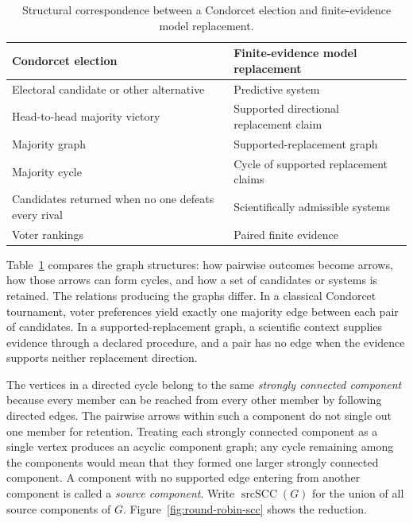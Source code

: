\documentclass[11pt]{article}
\theoremstyle{remark}
\begin{document}
\begin{table}[H]
\centering
\caption{Structural correspondence between a Condorcet election and
finite-evidence model replacement.}
\label{tab:round-robin-analogy}
\small
\begin{tabularx}{\textwidth}{@{}>{\raggedright\arraybackslash}p{}>{\raggedright\arraybackslash}X@{}}
\toprule
Condorcet election & Finite-evidence model replacement \\
\midrule
Electoral candidate or other alternative & Predictive system \\
Head-to-head majority victory & Supported directional replacement claim \\
Majority graph & Supported-replacement graph \\
Majority cycle & Cycle of supported replacement claims \\
Candidates returned when no one defeats every rival & Scientifically admissible systems \\
Voter rankings & Paired finite evidence \\
\bottomrule
\end{tabularx}
\end{table}

Table~\ref{tab:round-robin-analogy} compares the graph structures: how
pairwise outcomes become arrows, how those arrows can form cycles, and how a
set of candidates or systems is retained. The relations producing the graphs
differ. In a classical Condorcet tournament, voter preferences yield exactly
one majority edge between each pair of candidates. In a
supported-replacement graph, a scientific context supplies evidence through a
declared procedure, and a pair has no edge when the evidence supports neither
replacement direction.

The vertices in a directed cycle belong to the same \emph{strongly connected
component} because every member can be reached from every other member by
following directed edges. The pairwise arrows within such a component do not
single out one member for retention. Treating each strongly connected
component as a single vertex produces an acyclic component graph; any cycle
remaining among the components would mean that they formed one larger
strongly connected component. A component with no supported edge entering
from another component is called a \emph{source component}. Write
$\operatorname{srcSCC}(G)$ for the union of all source components of $G$.
Figure~\ref{fig:round-robin-scc} shows the reduction.
\end{document}
